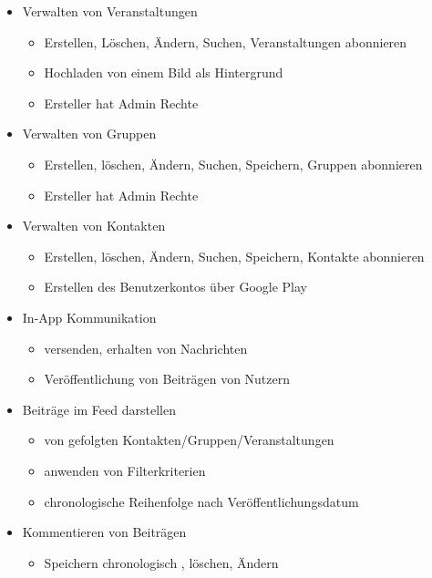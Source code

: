 \documentclass[parskip=full]{scrartcl}
\begin{document}
	\begin{itemize}
		\item Verwalten von Veranstaltungen
			\begin{itemize} 
				
				\item Erstellen, Löschen, Ändern, Suchen, Veranstaltungen abonnieren
				\item Hochladen von einem Bild als Hintergrund
				\item Ersteller hat Admin Rechte
			\end{itemize}
			
			\item Verwalten von Gruppen
				\begin{itemize}
					\item Erstellen, löschen, Ändern, Suchen, Speichern, Gruppen abonnieren
					\item Ersteller hat Admin Rechte
				\end{itemize}
			\item Verwalten von Kontakten
				\begin{itemize}
					\item Erstellen, löschen, Ändern, Suchen, Speichern, Kontakte abonnieren
					\item Erstellen des Benutzerkontos über Google Play
				\end{itemize}
			\item In-App Kommunikation
			\begin{itemize}
				\item versenden, erhalten von Nachrichten
				\item Veröffentlichung von Beiträgen von Nutzern
			\end{itemize}
			\item Beiträge im Feed darstellen
				\begin{itemize}
					\item von gefolgten Kontakten/Gruppen/Veranstaltungen
					\item anwenden von Filterkriterien
					\item chronologische Reihenfolge nach Veröffentlichungsdatum
				\end{itemize}
			\item Kommentieren von Beiträgen
				\begin{itemize}
					\item Speichern chronologisch , löschen, Ändern
				\end{itemize}	
	\end{itemize}
	
\end{document}
